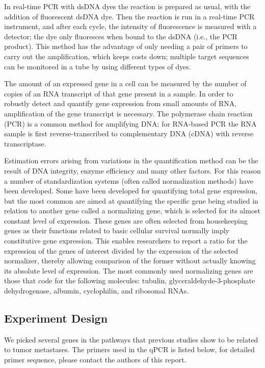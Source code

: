 		In real-time PCR with dsDNA dyes the reaction is prepared as usual, with the addition of fluorescent dsDNA dye. Then the reaction is run in a real-time PCR instrument, and after each cycle, the intensity of fluorescence is measured with a detector; the dye only fluoresces when bound to the dsDNA (i.e., the PCR product). This method has the advantage of only needing a pair of primers to carry out the amplification, which keeps costs down; multiple target sequences can be monitored in a tube by using different types of dyes.
		
		The amount of an expressed gene in a cell can be measured by the number of copies of an RNA transcript of that gene present in a sample. In order to robustly detect and quantify gene expression from small amounts of RNA, amplification of the gene transcript is necessary. The polymerase chain reaction (PCR) is a common method for amplifying DNA; for RNA-based PCR the RNA sample is first reverse-transcribed to complementary DNA (cDNA) with reverse transcriptase.
		
		Estimation errors arising from variations in the quantification method can be the result of DNA integrity, enzyme efficiency and many other factors. For this reason a number of standardization systems (often called normalization methods) have been developed. Some have been developed for quantifying total gene expression, but the most common are aimed at quantifying the specific gene being studied in relation to another gene called a normalizing gene, which is selected for its almost constant level of expression. These genes are often selected from housekeeping genes as their functions related to basic cellular survival normally imply constitutive gene expression. \cite{vandesompele2002accurate} This enables researchers to report a ratio for the expression of the genes of interest divided by the expression of the selected normalizer, thereby allowing comparison of the former without actually knowing its absolute level of expression. The most commonly used normalizing genes are those that code for the following molecules: tubulin, glyceraldehyde-3-phosphate dehydrogenase, albumin, cyclophilin, and ribosomal RNAs. \cite{wiki2018qpcr}


\subsection{Experiment Design}
We picked several genes in the pathways that previous studies show to be related to tumor metastases. The primers used in the qPCR is listed below, for detailed primer sequence, please contact the authors of this report.

